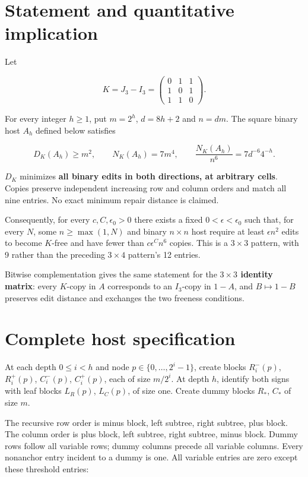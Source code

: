 \documentclass[11pt,letterpaper]{article}
\begin{document}
\section{Statement and quantitative
implication}\label{statement-and-quantitative-implication}

Let

\[
 K=J_3-I_3=\begin{pmatrix}0&1&1\\1&0&1\\1&1&0\end{pmatrix}.
\]

For every integer \(h\ge 1\), put \(m=2^h\), \(d=8h+2\) and \(n=dm\).
The square binary host \(A_h\) defined below satisfies

\[
 D_K(A_h)\ge m^2,\qquad N_K(A_h)=7m^4,
 \qquad \frac{N_K(A_h)}{n^6}=7d^{-6}4^{-h}.
\]

\(D_K\) minimizes \textbf{all binary edits in both directions, at
arbitrary cells}. Copies preserve independent increasing row and column
orders and match all nine entries. No exact minimum repair distance is
claimed.

Consequently, for every \(c,C,\epsilon _{0}>0\) there exists a fixed
\(0<\epsilon <\epsilon _{0}\) such that, for every \(N\), some
\(n\ge \max(1,N)\) and binary \(n\times n\) host require at least
\(\epsilon n^{2}\) edits to become \(K\)-free and have fewer than
\(c \epsilon ^C n^{6}\) copies. This is a \(3\times 3\) pattern, with 9
rather than the preceding \(3\times 4\) pattern's 12 entries.

Bitwise complementation gives the same statement for the
\textbf{\boldmath \(3\times 3\) identity matrix}: every \(K\)-copy in
\(A\) corresponds to an \(I_{3}\)-copy in \(1-A\), and \(B\mapsto 1-B\)
preserves edit distance and exchanges the two freeness conditions.

\section{Complete host specification}\label{complete-host-specification}

At each depth \(0\le i<h\) and node \(p\in \{0,\ldots ,2^i-1\}\), create
blocks \(R_i^-(p)\), \(R_i^+(p)\), \(C_i^-(p)\), \(C_i^+(p)\), each of
size \(m/2^i\). At depth \(h\), identify both signs with leaf blocks
\(L_R(p)\), \(L_C(p)\), of size one. Create dummy blocks \(R_*\),
\(C_*\) of size \(m\).


The recursive row order is minus block, left subtree, right subtree,
plus block. The column order is plus block, left subtree, right subtree,
minus block. Dummy rows follow all variable rows; dummy columns precede
all variable columns. Every nonanchor entry incident to a dummy is one.
All variable entries are zero except these threshold entries:
\end{document}
